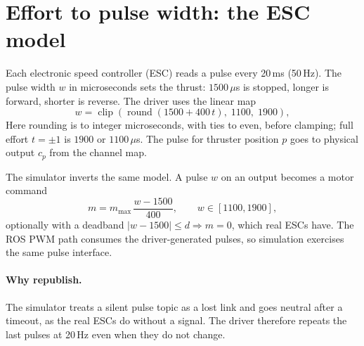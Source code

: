 \section{Effort to pulse width: the ESC model}
\label{sec:esc}

Each electronic speed controller (ESC) reads a pulse every 20\,ms (50\,Hz).
The pulse width $w$ in microseconds sets the thrust: $1500\,\mu$s is stopped,
longer is forward, shorter is reverse. The driver uses the linear map
\[
  w = \operatorname{clip}\!\left(\operatorname{round}(1500 + 400\,t),\; 1100,\; 1900\right),
\]
Here rounding is to integer microseconds, with ties to even, before clamping;
full effort $t=\pm1$ is $1900$ or $1100\,\mu$s. The pulse for thruster
position $p$ goes to physical output $c_p$ from the channel map.

The simulator inverts the same model. A pulse $w$ on an output becomes a motor
command
\[
  m = m_\text{max}\,\frac{w - 1500}{400},\qquad w\in[1100,1900],
\]
optionally with a deadband $|w-1500|\le d \Rightarrow m = 0$, which real ESCs
have. The ROS PWM path consumes the driver-generated pulses, so simulation
exercises the same pulse interface.

\paragraph{Why republish.} The simulator treats a silent pulse topic as a lost
link and goes neutral after a timeout, as the real ESCs do without a signal. The
driver therefore repeats the last pulses at 20\,Hz even when they do not change.

